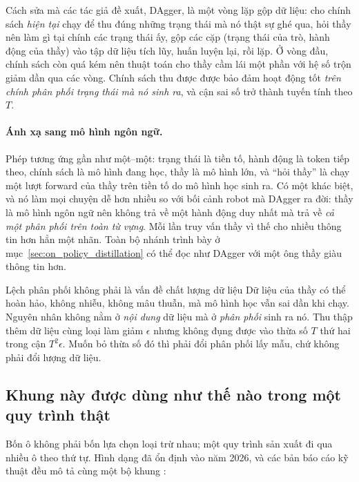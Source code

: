 Cách sửa mà các tác giả đề xuất, DAgger, là một vòng lặp gộp dữ liệu: cho chính sách \emph{hiện tại} chạy để thu đúng những trạng thái mà nó thật sự ghé qua, hỏi thầy nên làm gì tại chính các trạng thái ấy, gộp các cặp (trạng thái của trò, hành động của thầy) vào tập dữ liệu tích lũy, huấn luyện lại, rồi lặp. Ở vòng đầu, chính sách còn quá kém nên thuật toán cho thầy cầm lái một phần với hệ số trộn giảm dần qua các vòng. Chính sách thu được được bảo đảm hoạt động tốt \emph{trên chính phân phối trạng thái mà nó sinh ra}, và cận sai số trở thành tuyến tính theo $T$.

\paragraph{Ánh xạ sang mô hình ngôn ngữ.} Phép tương ứng gần như một--một: trạng thái là tiền tố, hành động là token tiếp theo, chính sách là mô hình đang học, thầy là mô hình lớn, và ``hỏi thầy'' là chạy một lượt forward của thầy trên tiền tố do mô hình học sinh ra. Có một khác biệt, và nó làm mọi chuyện dễ hơn nhiều so với bối cảnh robot mà DAgger ra đời: thầy là mô hình ngôn ngữ nên không trả về một hành động duy nhất mà trả về \emph{cả một phân phối trên toàn từ vựng}. Mỗi lần truy vấn thầy vì thế cho nhiều thông tin hơn hẳn một nhãn. Toàn bộ nhánh trình bày ở mục~\ref{sec:on_policy_distillation} có thể đọc như DAgger với một ông thầy giàu thông tin hơn.

\begin{pitfall}{Lệch phân phối không phải là vấn đề chất lượng dữ liệu}
Dữ liệu của thầy có thể hoàn hảo, không nhiễu, không mâu thuẫn, mà mô hình học vẫn sai dần khi chạy. Nguyên nhân không nằm ở \emph{nội dung} dữ liệu mà ở \emph{phân phối} sinh ra nó. Thu thập thêm dữ liệu cùng loại làm giảm $\epsilon$ nhưng không đụng được vào thừa số $T$ thứ hai trong cận $T^2\epsilon$. Muốn bỏ thừa số đó thì phải đổi phân phối lấy mẫu, chứ không phải đổi lượng dữ liệu.
\end{pitfall}

\subsection{Khung này được dùng như thế nào trong một quy trình thật}
\label{ssec:post_training_pipeline}

Bốn ô không phải bốn lựa chọn loại trừ nhau; một quy trình sản xuất đi qua nhiều ô theo thứ tự. Hình dạng đã ổn định vào năm 2026, và các bản báo cáo kỹ thuật đều mô tả cùng một bộ khung \cite{ma2026mopd, song2026opdsurvey}:

